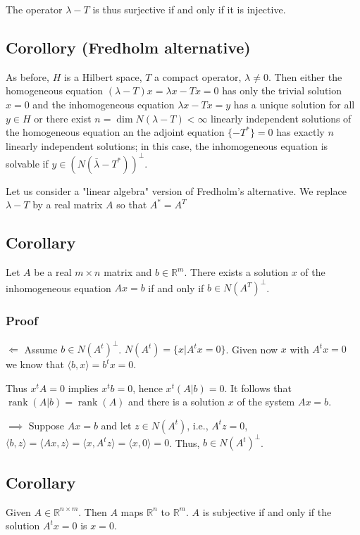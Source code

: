\documentclass[11pt]{article}
\def\R{\mathbb{R}}
\begin{document}
The operator \(\lambda - T\) is thus surjective if and only if it is injective.
\subsection{Corollory (Fredholm alternative)}
\label{sec:orgab878ac}
As before, \(H\) is a Hilbert space, \(T\) a compact operator, \(\lambda \neq 0\).
Then either the homogeneous equation \((\lambda - T)x = \lambda x - T x = 0\)
has only the trivial solution \(x = 0\) and the inhomogeneous equation \(\lambda
   x - Tx = y\) has a unique solution for all \(y \in H\) or there exist \(n = \dim
   N(\lambda - T) < \infty\) linearly independent solutions of the homogeneous
equation an the adjoint equation \(\{-T^{*}\} = 0\) has exactly \(n\) linearly
independent solutions; in this case, the inhomogeneous equation is solvable
if \(y \in (N(\bar{\lambda} - T^{*}))^\perp\).

Let us consider a "linear algebra" version of Fredholm's alternative. We
replace \(\lambda - T\) by a real matrix \(A\) so that \(A^{*} = A^{T}\)
\subsection{Corollary}
\label{sec:org332e0bf}
Let \(A\) be a real \(m\times n\) matrix and \(b \in \R^m\). There exists a
solution \(x\) of the inhomogeneous equation \(Ax = b\) if and only if \(b \in
   N(A^{T})^\perp\).
\subsubsection{Proof}
\label{sec:org310aebd}
\(\Leftarrow\) Assume \(b \in N(A^{t})^\perp\). \(N(A^{t}) = \{x \vert A^{t} x =
    0\}\). Given now \(x\) with \(A^{t}x = 0\) we know that \(\langle b, x\rangle =
    b^{t}x = 0\).

Thus \(x^t A = 0\) implies \(x^t b = 0\), hence \(x^{t}(A | b) = 0\). It follows
that \(\operatorname{rank}(A|b) = \operatorname{rank}(A)\) and there is a
solution \(x\) of the system \(Ax = b\).

\(\implies\) Suppose \(Ax = b\) and let \(z \in N(A^{t})\), i.e., \(A^{t}z = 0\),
\(\langle b, z \rangle = \langle Ax, z\rangle = \langle x, A^{t} z \rangle =
    \langle x, 0 \rangle = 0\). Thus, \(b \in N(A^{t})^\perp\).
\subsection{Corollary}
\label{sec:org6fc2011}
Given \(A \in \R^{n\times m}\). Then \(A\) maps \(\R^n\) to \(\R^m\). \(A\) is
subjective if and only if the solution \(A^{t}x = 0\) is \(x = 0\).
\end{document}
